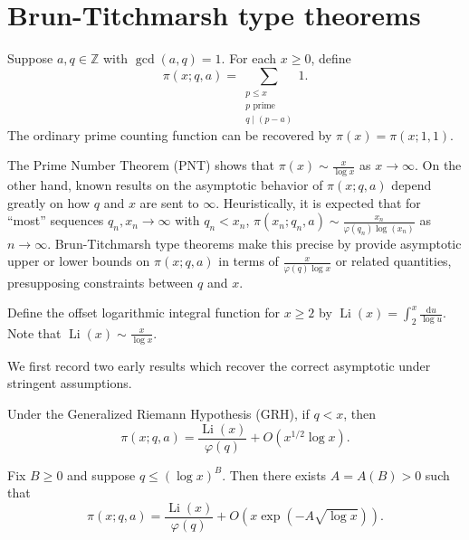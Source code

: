 \chapter{Brun-Titchmarsh type theorems}\label{brun-titchmarsh-chapter}


\begin{definition}
Suppose $a,q\in\mathbb Z$ with $\gcd(a,q)=1$. For each $x\geq0$, define
$$\pi(x;q,a)=\sum_{\substack{p\leq x\\p\text{ prime}\\q\mid(p-a)}}1.$$
The ordinary prime counting function can be recovered by $\pi(x)=\pi(x;1,1)$.
\end{definition}

The Prime Number Theorem (PNT) shows that $\pi(x)\sim\frac x{\log x}$ as $x\to\infty$. On the other hand, known results on the asymptotic behavior of $\pi(x;q,a)$ depend greatly on how $q$ and $x$ are sent to $\infty$. Heuristically, it is expected that for ``most'' sequences $q_n,x_n\to\infty$ with $q_n<x_n$, $\pi(x_n;q_n,a)\sim\frac{x_n}{\varphi(q_n)\log(x_n)}$ as $n\to\infty$. Brun-Titchmarsh type theorems make this precise by provide asymptotic upper or lower bounds on $\pi(x;q,a)$ in terms of $\frac x{\varphi(q)\log x}$ or related quantities, presupposing constraints between $q$ and $x$.

\begin{definition}
Define the offset logarithmic integral function for $x\geq2$ by $\operatorname{Li}(x)=\int_2^x\frac{\mathrm du}{\log u}$. Note that $\operatorname{Li}(x)\sim\frac x{\log x}$.
\end{definition}

We first record two early results which recover the correct asymptotic under stringent assumptions.

\begin{theorem}\label{titchmarsh-GRH-asymptotic}
Under the Generalized Riemann Hypothesis (GRH), if $q<x$, then
$$\pi(x;q,a)=\frac{\operatorname{Li}(x)}{\varphi(q)}+O(x^{1/2}\log x).$$
\end{theorem}

\begin{theorem}\label{walfisz-small-q-asymptotic}
Fix $B\geq0$ and suppose $q\leq(\log x)^B$. Then there exists $A=A(B)>0$ such that
$$\pi(x;q,a)=\frac{\operatorname{Li}(x)}{\varphi(q)}+O(x\exp(-A\sqrt{\log x})).$$
\end{theorem}

